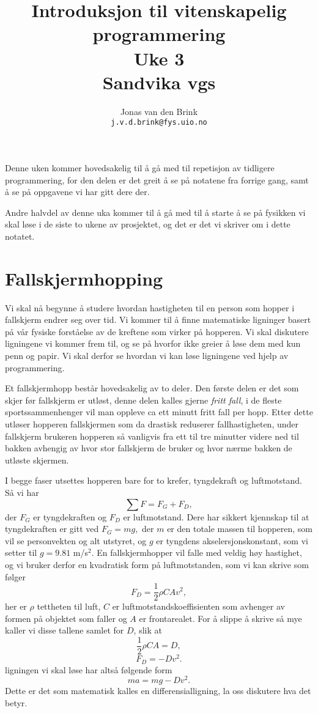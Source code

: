 \documentclass[a4paper, 11pt, notitlepage, english]{article}
\author{Jonas van den Brink \\ \texttt{j.v.d.brink@fys.uio.no}}
\title{Introduksjon til vitenskapelig programmering \\ Uke 3 \\ Sandvika vgs}
\begin{document}
\maketitle

Denne uken kommer hovedsakelig til å gå med til repetisjon av tidligere programmering, for den delen er det greit å se på notatene fra forrige gang, samt å se på oppgavene vi har gitt dere der.

Andre halvdel av denne uka kommer til å gå med til å starte å se på fysikken vi skal løse i de siste to ukene av prosjektet, og det er det vi skriver om i dette notatet.


\section{Fallskjermhopping}

Vi skal nå begynne å studere hvordan hastigheten til en person som hopper i fallskjerm endrer seg over tid. Vi kommer til å finne matematiske ligninger basert på vår fysiske forståelse av de kreftene som virker på hopperen. Vi skal diskutere ligningene vi kommer frem til, og se på hvorfor ikke greier å løse dem med kun penn og papir. Vi skal derfor se hvordan vi kan løse ligningene ved hjelp av programmering.


Et fallskjermhopp består hovedsakelig av to deler. Den første delen er det som skjer før fallskjerm er utløst, denne delen kalles gjerne \emph{fritt fall}, i de fleste sportssammenhenger vil man oppleve ca ett minutt fritt fall per hopp. Etter dette utløser hopperen fallskjermen som da drastisk reduserer fallhastigheten, under fallskjerm brukeren hopperen så vanligvis fra ett til tre minutter videre ned til bakken avhengig av hvor stor fallskjerm de bruker og hvor nærme bakken de utløste skjermen.

I begge faser utsettes hopperen bare for to krefer, tyngdekraft og luftmotstand. Så vi har
$$\sum F = F_G + F_D,$$
der $F_G$ er tyngdekraften og $F_D$ er luftmotstand. Dere har sikkert kjennskap til at tyngdekraften er gitt ved
$F_G = mg,$
der $m$ er den totale massen til hopperen, som vil se personvekten og alt utstyret, og $g$ er tyngdens akselersjonskonstant, som vi setter til $g=9.81$ m/s$^2$. En fallskjermhopper vil falle med veldig høy hastighet, og vi bruker derfor en kvadratisk form på luftmotstanden, som vi kan skrive som følger
$$F_D = \frac{1}{2}\rho C A v^2,$$
her er $\rho$ tettheten til luft, $C$ er luftmotstandskoeffisienten som avhenger av formen på objektet som faller og $A$ er frontarealet.
For å slippe å skrive så mye kaller vi disse tallene samlet for $D$, slik at
$$\frac{1}{2}\rho C A = D,$$
$$F_D = -Dv^2.$$
ligningen vi skal løse har altså følgende form
$$ma = mg - D v^2.$$
Dette er det som matematisk kalles en differensialligning, la oss diskutere hva det betyr.
\end{document}
